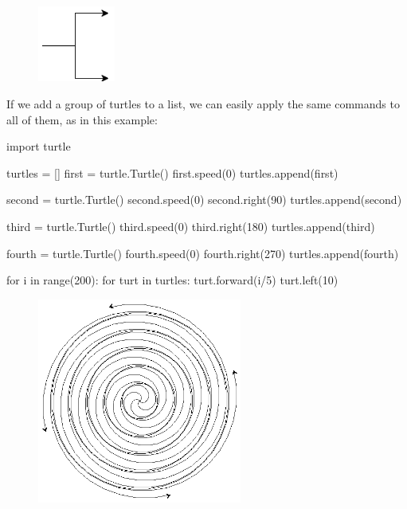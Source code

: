 \documentclass[11pt]{cselabheader}
\begin{document}
\begin{figure}[h]
  \centering
  \includegraphics[width=1.0in]{img/turtle_prong}
\end{figure}

If we add a group of turtles to a list, we can easily apply the same commands to all of them, as in this example:

\begin{python3code}
import turtle

turtles = []
first = turtle.Turtle()
first.speed(0)
turtles.append(first)

second = turtle.Turtle()
second.speed(0)
second.right(90)
turtles.append(second)

third = turtle.Turtle()
third.speed(0)
third.right(180)
turtles.append(third)

fourth = turtle.Turtle()
fourth.speed(0)
fourth.right(270)
turtles.append(fourth)

for i in range(200):
    for turt in turtles:
        turt.forward(i/5)
        turt.left(10)
\end{python3code}

\begin{figure}[h]
  \centering
  \includegraphics[width=0.6\textwidth]{img/fancy_spiral}
\end{figure}
\end{document}
